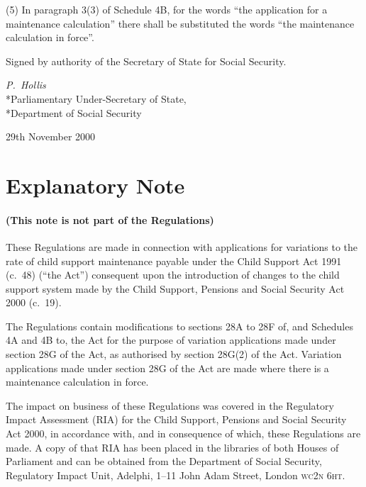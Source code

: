 \documentclass[12pt,a4paper]{article}
\begin{document}
(5) In paragraph 3(3) of Schedule 4B, for the words “the application for a maintenance calculation” there shall be substituted the words “the maintenance calculation in force”. 


\bigskip

Signed 
by authority of the Secretary of State for Social Security.

{\raggedleft
\emph{P.~Hollis}\\*Parliamentary Under-Secretary of State,\\*Department of Social Security

}

29th November 2000

\small

\part{Explanatory Note}

\renewcommand\parthead{--- Explanatory Note}

\subsection*{(This note is not part of the Regulations)}

These Regulations are made in connection with applications for variations to the rate of child support maintenance payable under the Child Support Act 1991 (c.\ 48) (“the Act”) consequent upon the introduction of changes to the child support system made by the Child Support, Pensions and Social Security Act 2000 (c.\ 19).

The Regulations contain modifications to sections 28A to 28F of, and Schedules 4A and 4B to, the Act for the purpose of variation applications made under section 28G of the Act, as authorised by section 28G(2) of the Act. Variation applications made under section 28G of the Act are made where there is a maintenance calculation in force.

The impact on business of these Regulations was covered in the Regulatory Impact Assessment (RIA) for the Child Support, Pensions and Social Security Act 2000, in accordance with, and in consequence of which, these Regulations are made. A copy of that RIA has been placed in the libraries of both Houses of Parliament and can be obtained from the Department of Social Security, Regulatory Impact Unit, Adelphi, 1--11 John Adam Street, London \textsc{\lowercase{WC2N 6HT}}.  
\end{document}
